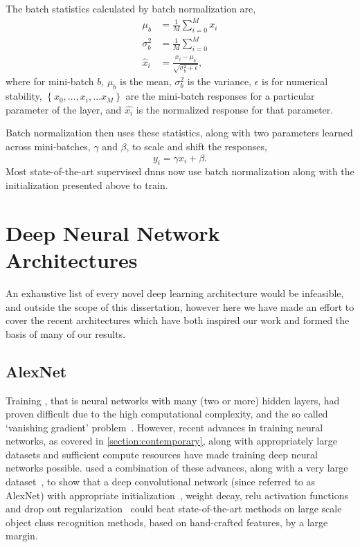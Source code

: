 \documentclass[thesis]{subfiles}
\begin{document}
The batch statistics calculated by batch normalization are,
\begin{equation}
\begin{aligned}
    \mu_b &= \frac{1}{M} \sum^M_{i=0} x_i\\
    \sigma^2_b &= \frac{1}{M} \sum^M_{i=0}\\
    \hat{x}_i &= \frac{x_i - \mu_b}{\sqrt{\sigma^2_b + \epsilon}},
\end{aligned}
\end{equation}
where for mini-batch $b$, $\mu_b$ is the mean, $\sigma^2_b$ is the variance, $\epsilon$ is for numerical stability, $\left\{x_0, \ldots, x_i, \ldots x_M\right\}$ are the mini-batch responses for a particular parameter of the layer, and $\hat{x_i}$ is the normalized response for that parameter. 

Batch normalization then uses these statistics, along with two parameters learned across mini-batches, $\gamma$ and $\beta$, to scale and shift the responses,
\begin{equation}    
    y_i = \gamma \hat{x_i} + \beta.
\end{equation}
%
Most state-of-the-art supervised \glspl{dnn} now use batch normalization along with the initialization presented above to train.
\section{Deep Neural Network Architectures}
An exhaustive list of every novel deep learning architecture would be infeasible, and outside the scope of this dissertation, however here we have made an effort to cover the recent architectures which have both inspired our work and formed the basis of many of our results.

\subsection{AlexNet}
Training \emph{}, that is neural networks with many (\ie two or more) hidden layers, had proven difficult due to the high computational complexity, and the so called `vanishing gradient' problem~\citep{bengio:ieeenn94}. However, recent advances in training neural networks, as covered in \cref{section:contemporary}, along with appropriately large datasets and sufficient compute resources have made training deep neural networks possible. \citet{Krizhevsky2012} used a combination of these advances, along with a very large dataset~\citep{ILSVRC2015}, to show that a deep convolutional network (since referred to as AlexNet) with appropriate initialization~\citep{Sutskever2013momentum}, weight decay, \gls{relu} activation functions~\citep{conf/icml/NairH10} and drop out regularization~\citep{Hinton2012} could beat state-of-the-art methods on large scale object class recognition methods, based on hand-crafted features, by a large margin. 
\end{document}

